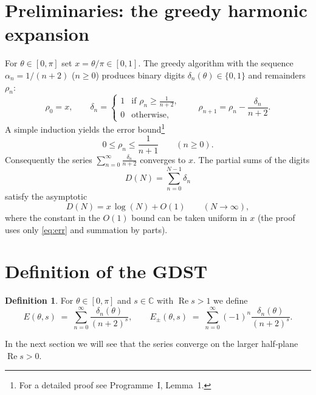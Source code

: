 \documentclass[11pt,a4paper]{article}
\theoremstyle{definition}
\newtheorem{definition}[theorem]{Definition}
\theoremstyle{remark}
\begin{document}
\section{Preliminaries: the greedy harmonic expansion}
For \(\theta\in[0,\pi]\) set \(x=\theta/\pi\in[0,1]\).
The greedy algorithm with the sequence \(\alpha_n=1/(n+2)\) (\(n\ge 0\)) produces binary digits \(\delta_n(\theta)\in\{0,1\}\) and remainders \(\rho_n\):
\[
\rho_0 = x,\qquad 
\delta_n = \begin{cases}
1 & \text{if }\rho_n \ge \frac{1}{n+2},\\[2pt]
0 & \text{otherwise},
\end{cases}
\qquad 
\rho_{n+1} = \rho_n - \frac{\delta_n}{n+2}.
\]
A simple induction yields the error bound\footnote{For a detailed proof see Programme~I, Lemma~1.}
\begin{equation}\label{eq:err}
0\le \rho_n \le \frac{1}{n+1}\qquad (n\ge 0).
\end{equation}
Consequently the series \(\sum_{n=0}^{\infty}\frac{\delta_n}{n+2}\) converges to \(x\).
The partial sums of the digits
\[
D(N)= \sum_{n=0}^{N-1}\delta_n
\]
satisfy the asymptotic
\begin{equation}\label{eq:Dlog}
D(N) = x\,\log(N) + O(1) \qquad (N\to\infty),
\end{equation}
where the constant in the \(O(1)\) bound can be taken uniform in \(x\) (the proof uses only \eqref{eq:err} and summation by parts).

\section{Definition of the GDST}
\begin{definition}
For \(\theta\in[0,\pi]\) and \(s\in\mathbb{C}\) with \(\operatorname{Re}s>1\) we define
\[
E(\theta,s) \;=\; \sum_{n=0}^{\infty}\frac{\delta_n(\theta)}{(n+2)^s},\qquad
E_{\pm}(\theta,s) \;=\; \sum_{n=0}^{\infty}(-1)^n\frac{\delta_n(\theta)}{(n+2)^s}.
\]
\end{definition}
In the next section we will see that the series converge on the larger half‑plane \(\operatorname{Re}s>0\).
\end{document}
